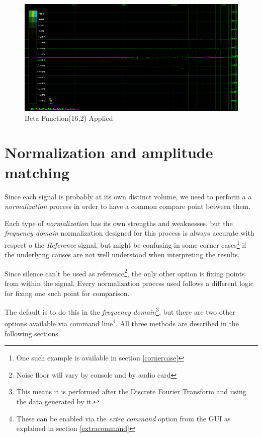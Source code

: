 \documentclass[10pt,a4paper]{report}
\begin{document}
\begin{appendices}
\begin{figure}[H]
	\centering
	\includegraphics[width=1\linewidth]{images/colorfilter/BetaFunctionPlot_5_Data.png}
	\caption[Beta Function(16,2)]{Beta Function(16,2) Applied}
	\label{fig:betafunctionplot5data}
\end{figure}

\chapter{Normalization and amplitude matching}
\label{normalization}

Since each signal is probably at its own distinct volume, we need to perform a a \textit{normalization} process in order to have a common compare point between them.

Each type of \textit{normalization} has its own strengths and weaknesses, but the \textit{frequency domain} normalization designed for this process is always accurate with respect o the \textit{Reference} signal, but might be confusing in some corner cases\footnote{One such example is available in section \ref{cornercase}} if the underlying causes are not well understood when interpreting the results.

Since silence can't be used as reference\footnote{Noise floor will vary by console and by audio card}, the only other option is fixing points from within the signal. Every normalization process used follows a different logic for fixing one such point for comparison.

The default is to do this in the \textit{frequency domain}\footnote{This means it is performed after the Discrete Fourier Transform and using the data generated by it.}, but there are two other options available via command line\footnote{These can be enabled via the \textit{extra command} option from the GUI as explained in section \ref{extracommand}}. All three methods are described in the following sections.


\end{appendices}
\end{document}
